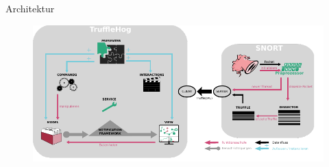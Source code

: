 \begin{frame}{Architektur}
    \begin{figure}
    	\centering
    	\includegraphics[width=\textwidth]{./images/arch/16.pdf}
    \end{figure}
\end{frame}
